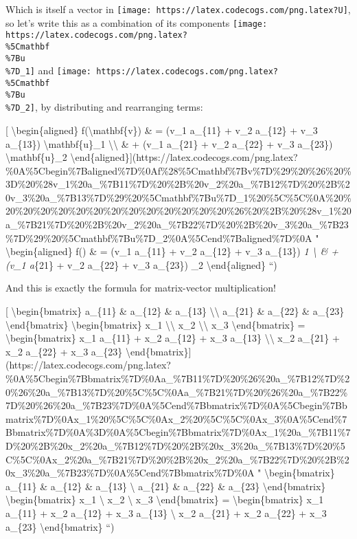 \documentclass[]{article}
\begin{document}
Which is itself a vector in
\texttt{[image: https://latex.codecogs.com/png.latex?U]}, so let's write this as
a combination of its components
\texttt{[image: https://latex.codecogs.com/png.latex?\\\%5Cmathbf\\\%7Bu\\\%7D\_1]} and
\texttt{[image: https://latex.codecogs.com/png.latex?\\\%5Cmathbf\\\%7Bu\\\%7D\_2]}, by
distributing and rearranging terms:

{[} \textbackslash{}begin\{aligned\} f(\textbackslash{}mathbf\{v\}) \& = (v\_1
a\_\{11\} + v\_2 a\_\{12\} + v\_3 a\_\{13\}) \textbackslash{}mathbf\{u\}\_1
\textbackslash{}\textbackslash{} \& + (v\_1 a\_\{21\} + v\_2 a\_\{22\} + v\_3
a\_\{23\}) \textbackslash{}mathbf\{u\}\_2
\textbackslash{}end\{aligned\}{]}(https://latex.codecogs.com/png.latex?\%0A\%5Cbegin\%7Baligned\%7D\%0Af\%28\%5Cmathbf\%7Bv\%7D\%29\%20\%26\%20\%3D\%20\%28v\_1\%20a\_\%7B11\%7D\%20\%2B\%20v\_2\%20a\_\%7B12\%7D\%20\%2B\%20v\_3\%20a\_\%7B13\%7D\%29\%20\%5Cmathbf\%7Bu\%7D\_1\%20\%5C\%5C\%0A\%20\%20\%20\%20\%20\%20\%20\%20\%20\%20\%20\%20\%20\%20\%26\%20\%2B\%20\%28v\_1\%20a\_\%7B21\%7D\%20\%2B\%20v\_2\%20a\_\%7B22\%7D\%20\%2B\%20v\_3\%20a\_\%7B23\%7D\%29\%20\%5Cmathbf\%7Bu\%7D\_2\%0A\%5Cend\%7Baligned\%7D\%0A
" \textbackslash{}begin\{aligned\} f() \& = (v\_1 a\_\{11\} + v\_2
a\_\{12\} + v\_3 a\_\{13\}) \emph{1 \textbackslash{} \& + (v\_1
a}\{21\} + v\_2 a\_\{22\} + v\_3 a\_\{23\}) \_2
\textbackslash{}end\{aligned\} ``)

And this is exactly the formula for matrix-vector multiplication!

{[} \textbackslash{}begin\{bmatrix\} a\_\{11\} \& a\_\{12\} \& a\_\{13\}
\textbackslash{}\textbackslash{} a\_\{21\} \& a\_\{22\} \& a\_\{23\}
\textbackslash{}end\{bmatrix\} \textbackslash{}begin\{bmatrix\} x\_1
\textbackslash{}\textbackslash{} x\_2 \textbackslash{}\textbackslash{} x\_3
\textbackslash{}end\{bmatrix\} = \textbackslash{}begin\{bmatrix\} x\_1 a\_\{11\}
+ x\_2 a\_\{12\} + x\_3 a\_\{13\} \textbackslash{}\textbackslash{} x\_2
a\_\{21\} + x\_2 a\_\{22\} + x\_3 a\_\{23\}
\textbackslash{}end\{bmatrix\}{]}(https://latex.codecogs.com/png.latex?\%0A\%5Cbegin\%7Bbmatrix\%7D\%0Aa\_\%7B11\%7D\%20\%26\%20a\_\%7B12\%7D\%20\%26\%20a\_\%7B13\%7D\%20\%5C\%5C\%0Aa\_\%7B21\%7D\%20\%26\%20a\_\%7B22\%7D\%20\%26\%20a\_\%7B23\%7D\%0A\%5Cend\%7Bbmatrix\%7D\%0A\%5Cbegin\%7Bbmatrix\%7D\%0Ax\_1\%20\%5C\%5C\%0Ax\_2\%20\%5C\%5C\%0Ax\_3\%0A\%5Cend\%7Bbmatrix\%7D\%0A\%3D\%0A\%5Cbegin\%7Bbmatrix\%7D\%0Ax\_1\%20a\_\%7B11\%7D\%20\%2B\%20x\_2\%20a\_\%7B12\%7D\%20\%2B\%20x\_3\%20a\_\%7B13\%7D\%20\%5C\%5C\%0Ax\_2\%20a\_\%7B21\%7D\%20\%2B\%20x\_2\%20a\_\%7B22\%7D\%20\%2B\%20x\_3\%20a\_\%7B23\%7D\%0A\%5Cend\%7Bbmatrix\%7D\%0A
" \textbackslash{}begin\{bmatrix\} a\_\{11\} \& a\_\{12\} \& a\_\{13\}
\textbackslash{} a\_\{21\} \& a\_\{22\} \& a\_\{23\}
\textbackslash{}end\{bmatrix\} \textbackslash{}begin\{bmatrix\} x\_1
\textbackslash{} x\_2 \textbackslash{} x\_3 \textbackslash{}end\{bmatrix\} =
\textbackslash{}begin\{bmatrix\} x\_1 a\_\{11\} + x\_2 a\_\{12\} + x\_3
a\_\{13\} \textbackslash{} x\_2 a\_\{21\} + x\_2 a\_\{22\} + x\_3 a\_\{23\}
\textbackslash{}end\{bmatrix\} ``)
\end{document}

